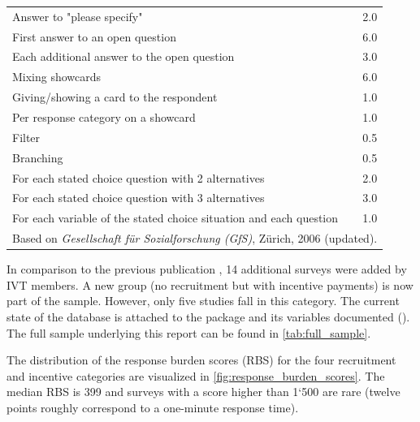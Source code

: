 \documentclass[a4paper]{article}\usepackage[]{graphicx}\usepackage[]{xcolor}
\begin{document}
\begin{table}
\begin{tabular}[t]{lr}
Answer to "please specify" & 2.0\\
First answer to an open question & 6.0\\
\hspace{2em}Each additional answer to the open question & 3.0\\
Mixing showcards & 6.0\\
\addlinespace
Giving/showing a card to the respondent & 1.0\\
\hspace{2em}Per response category on a showcard & 1.0\\
Filter & 0.5\\
Branching & 0.5\\
For each stated choice question with 2 alternatives & 2.0\\
\addlinespace
For each stated choice question with 3 alternatives & 3.0\\
For each variable of the stated choice situation and each question & 1.0\\
\bottomrule
\multicolumn{2}{l}{\rule{0pt}{1em}Based on \textit{Gesellschaft für Sozialforschung (GfS)}, Zürich, 2006 (updated).}\\
\end{tabular}
\end{table}



In comparison to the previous publication \citep{schmid2019predicting}, 14 additional surveys were added by IVT members. A new group (no recruitment but with incentive payments) is now part of the sample. However, only five studies fall in this category. The current state of the database is attached to the package  and its variables documented (). The full sample underlying this report can be found in \cref{tab:full_sample}.

The distribution of the response burden scores (RBS) for the four recruitment and incentive categories are visualized in \cref{fig:response_burden_scores}. The median RBS is 399 and surveys with a score higher than 1`500 are rare (twelve points roughly correspond to a one-minute response time).
\end{document}
